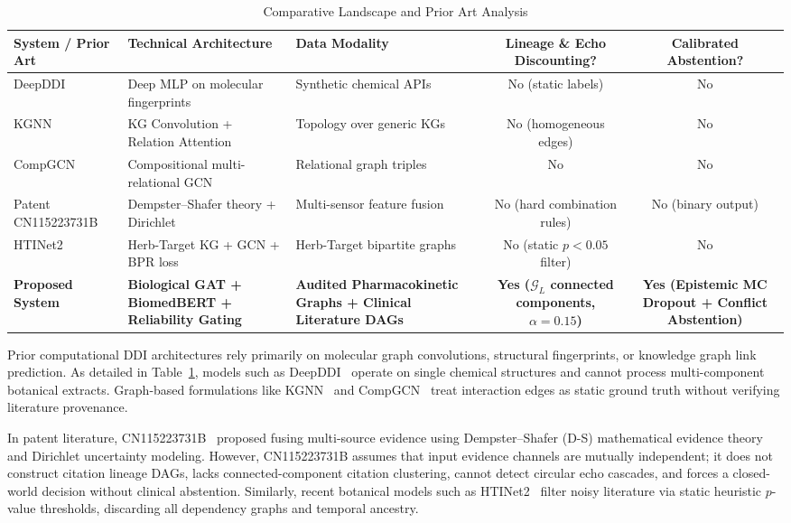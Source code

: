 \documentclass[10pt,journal,compsoc]{IEEEtran}
\begin{document}
\begin{table}[t]
\centering
\caption{Comparative Landscape and Prior Art Analysis}
\label{tab:prior_art}
\small
\begin{tabular}{lp{3.2cm}p{3.2cm}cc}
\toprule
\textbf{System / Prior Art} & \textbf{Technical Architecture} & \textbf{Data Modality} & \textbf{Lineage \& Echo Discounting?} & \textbf{Calibrated Abstention?} \\
\midrule
DeepDDI~\cite{ryu2018deep} & Deep MLP on molecular fingerprints & Synthetic chemical APIs & No (static labels) & No \\
KGNN~\cite{wang2019kgnn} & KG Convolution + Relation Attention & Topology over generic KGs & No (homogeneous edges) & No \\
CompGCN~\cite{vashishth2020compgcn} & Compositional multi-relational GCN & Relational graph triples & No & No \\
Patent CN115223731B~\cite{cn115223731b} & Dempster--Shafer theory + Dirichlet & Multi-sensor feature fusion & No (hard combination rules) & No (binary output) \\
HTINet2~\cite{htinet2024} & Herb-Target KG + GCN + BPR loss & Herb-Target bipartite graphs & No (static $p<0.05$ filter) & No \\
\textbf{Proposed System} & \textbf{Biological GAT + BiomedBERT + Reliability Gating} & \textbf{Audited Pharmacokinetic Graphs + Clinical Literature DAGs} & \textbf{Yes ($\mathcal{G}_L$ connected components, $\alpha=0.15$)} & \textbf{Yes (Epistemic MC Dropout + Conflict Abstention)} \\
\bottomrule
\end{tabular}
\end{table}

Prior computational DDI architectures rely primarily on molecular graph convolutions, structural fingerprints, or knowledge graph link prediction. As detailed in Table~\ref{tab:prior_art}, models such as DeepDDI~\cite{ryu2018deep} operate on single chemical structures and cannot process multi-component botanical extracts. Graph-based formulations like KGNN~\cite{wang2019kgnn} and CompGCN~\cite{vashishth2020compgcn} treat interaction edges as static ground truth without verifying literature provenance. 

In patent literature, CN115223731B~\cite{cn115223731b} proposed fusing multi-source evidence using Dempster--Shafer (D-S) mathematical evidence theory and Dirichlet uncertainty modeling. However, CN115223731B assumes that input evidence channels are mutually independent; it does not construct citation lineage DAGs, lacks connected-component citation clustering, cannot detect circular echo cascades, and forces a closed-world decision without clinical abstention. Similarly, recent botanical models such as HTINet2~\cite{htinet2024} filter noisy literature via static heuristic $p$-value thresholds, discarding all dependency graphs and temporal ancestry.
\end{document}
